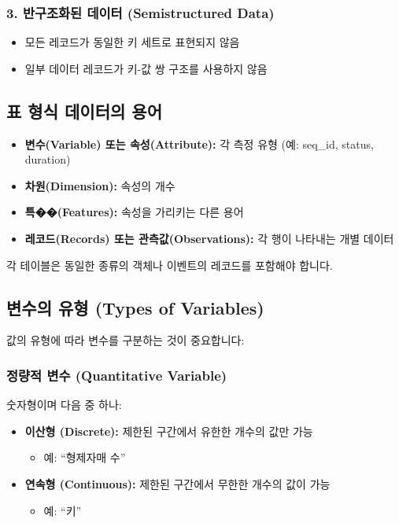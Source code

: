 \documentclass[12pt,a4paper]{article}
\begin{document}
\subsubsection{3. 반구조화된 데이터 (Semistructured Data)}
\begin{itemize}
    \item 모든 레코드가 동일한 키 세트로 표현되지 않음
    \item 일부 데이터 레코드가 키-값 쌍 구조를 사용하지 않음
\end{itemize}

\subsection{표 형식 데이터의 용어}

\begin{itemize}
    \item \textbf{변수(Variable) 또는 속성(Attribute):} 각 측정 유형 (예: seq\_id, status, duration)
    \item \textbf{차원(Dimension):} 속성의 개수
    \item \textbf{특��(Features):} 속성을 가리키는 다른 용어
    \item \textbf{레코드(Records) 또는 관측값(Observations):} 각 행이 나타내는 개별 데이터
\end{itemize}

각 테이블은 동일한 종류의 객체나 이벤트의 레코드를 포함해야 합니다.

\subsection{변수의 유형 (Types of Variables)}

값의 유형에 따라 변수를 구분하는 것이 중요합니다:

\subsubsection{정량적 변수 (Quantitative Variable)}
숫자형이며 다음 중 하나:
\begin{itemize}
    \item \textbf{이산형 (Discrete):} 제한된 구간에서 유한한 개수의 값만 가능
    \begin{itemize}
        \item 예: ``형제자매 수''
    \end{itemize}
    \item \textbf{연속형 (Continuous):} 제한된 구간에서 무한한 개수의 값이 가능
    \begin{itemize}
        \item 예: ``키''
    \end{itemize}
\end{itemize}
\end{document}
